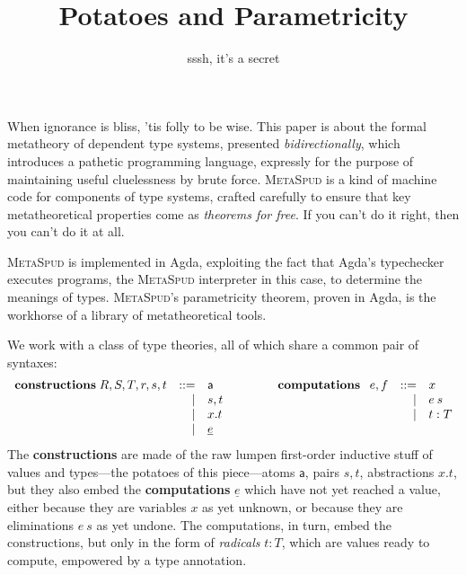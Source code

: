 \documentclass[acmsmall, screen, review]{acmart}
\newcommand{\ms}{\textsc{MetaSpud}}
\begin{document}
\title{Potatoes and Parametricity}
\author{sssh, it's a secret}
\maketitle

When ignorance is bliss, 'tis folly to be wise. This paper is about
the formal metatheory of dependent type systems, presented \emph{bidirectionally},
which introduces a pathetic programming language, expressly for the
purpose of maintaining useful cluelessness by brute force. \ms{} is a kind of
machine code for components of type systems, crafted carefully to
ensure that key metatheoretical properties come as \emph{theorems for free}.
If you can't do it right, then you can't do it at all.

\ms{} is implemented in Agda, exploiting the fact that Agda's typechecker
executes programs, the \ms{} interpreter in this case, to determine the
meanings of types. \ms's parametricity theorem, proven in Agda, is the workhorse
of a library of metatheoretical tools.

We work with a class of type theories, all of which share a common pair of syntaxes:
\newcommand{\at}[1]{\mathsf{#1}}
\newcommand{\cn}[2]{#1, #2}
\newcommand{\ab}[2]{#1. #2}
\newcommand{\el}[1]{\underline{#1}}
\newcommand{\ra}[2]{#1 : #2}
\[\begin{array}[t]{rrl}
    \textbf{constructions}\;
    R,S,T,r,s,t & ::= & \at a \\
                &   | & \cn s t \\
                &   | & \ab x t \\
                &   | & \el e \\
  \end{array}
  \qquad\qquad
  \textbf{computations}\;
  \begin{array}[t]{rrl}
    e,f & ::= & x \\
        &   | & e\:s \\
        &   | & \ra t T \\
  \end{array}
\]
The \textbf{constructions} are made of the raw lumpen first-order inductive stuff
of values and types---the potatoes
of this piece---atoms $\at a$, pairs $\cn s t$, abstractions $\ab x t$, but they
also embed the \textbf{computations} $\el e$ which have not yet reached a value,
either because they are variables $x$ as yet unknown, or because they are eliminations
$e\:s$ as yet undone. The computations, in turn, embed the constructions, but only in
the form of \emph{radicals} $\ra t T$, which are values ready to compute, empowered
by a type annotation.
\end{document}
